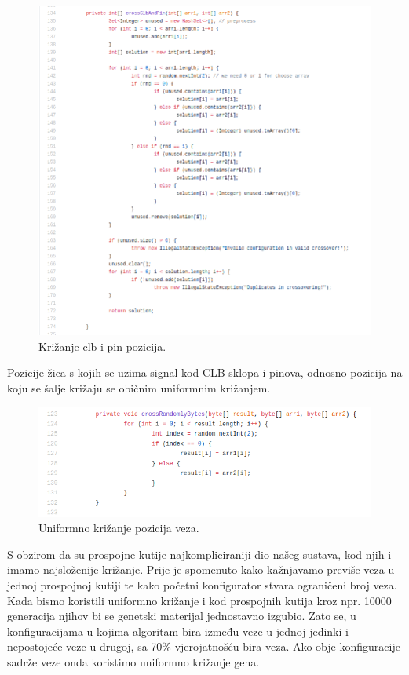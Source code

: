 \documentclass[times, utf8, zavrsni]{fer}
\begin{document}
\begin{figure}[H]
	\centering
	\includegraphics[width=18cm]{slike/crossClbAndPin.png}
	\caption{Križanje clb i pin pozicija.}
	\label{fig:clb-and-pin-positions}
\end{figure} 

Pozicije žica s kojih se uzima signal kod CLB sklopa i pinova, odnosno pozicija na koju se šalje križaju se običnim uniformnim križanjem. 

\begin{figure}[H]
	\centering
	\includegraphics[width=18cm]{slike/crossRandomlyBytes.png}
	\caption{Uniformno križanje pozicija veza.}
	\label{fig:uniform-connection-crossing}
\end{figure} 

S obzirom da su prospojne kutije najkompliciraniji dio našeg sustava, kod njih i imamo najsloženije križanje. Prije je spomenuto kako kažnjavamo previše veza u jednoj prospojnoj kutiji te kako početni konfigurator stvara ograničeni broj veza. Kada bismo koristili uniformno križanje i kod prospojnih kutija kroz npr. 10000 generacija njihov bi se genetski materijal jednostavno izgubio. Zato se, u konfiguracijama u kojima algoritam bira između veze u jednoj jedinki i nepostojeće veze u drugoj, sa 70\% vjerojatnošću bira veza. Ako obje konfiguracije sadrže veze onda koristimo uniformno križanje gena. 
\end{document}
